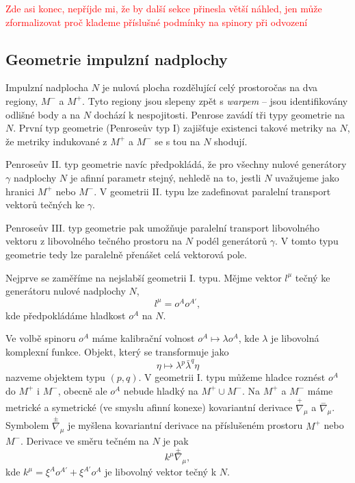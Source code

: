 \textcolor{red}{Zde asi konec, nepříjde mi, že by další sekce přinesla větší náhled, jen může zformalizovat proč klademe
příslušné podmínky na spinory při odvození}
\subsection{Geometrie impulzní nadplochy}

Impulzní nadplocha $N$ je nulová plocha rozdělující celý prostoročas na dva regiony, $M^-$ a $M^+$.
Tyto regiony jsou slepeny zpět s \emph{warpem} -- jsou identifikovány odlišné body a na $N$ dochází k
nespojitosti. Penrose zavádí tři typy geometrie na $N$.
První typ geometrie (Penroseův typ I) zajišťuje existenci takové metriky na $N$, že metriky indukované z $M^+$ a $M^-$
se s tou na $N$ shodují.

Penroseův II. typ geometrie navíc předpokládá, že pro všechny nulové generátory $\gamma$ nadplochy $N$
je afinní parametr stejný, nehledě na to, jestli $N$ uvažujeme jako hranici $M^+$ nebo $M^-$.
V geometrii II. typu lze zadefinovat paralelní transport vektorů tečných ke $\gamma$.

Penroseův III. typ geometrie pak umožňuje paralelní transport libovolného vektoru z libovolného tečného prostoru
na $N$ podél generátorů $\gamma$. V tomto typu geometrie tedy lze paralelně přenášet celá vektorová pole.

Nejprve se zaměříme na nejslabší geometrii I. typu. Mějme vektor $l^\mu$ tečný ke generátoru
nulové nadplochy $N$,
\begin{equation}
    l^\mu = o^A o^{A'},
\end{equation}
kde předpokládáme hladkost $o^A$ na $N$.

Ve volbě spinoru $o^A$ máme kalibrační volnost $o^A \mapsto \lambda o^A$, kde $\lambda$ je libovolná komplexní funkce.
Objekt, který se transformuje jako
\begin{equation}
    \eta \mapsto \lambda^p \bar{\lambda}^q \eta
\end{equation}
nazveme objektem typu $(p, q)$. V geometrii I. typu můžeme hladce roznést $o^A$ do
$M^+$ i $M^-$, obecně ale $o^A$ nebude hladký na $M^+ \cup M^-$. Na $M^+$ a $M^-$ máme
metrické a symetrické (ve smyslu afinní konexe) kovariantní derivace $\stackrel{+}{\nabla}_\mu$ a $\stackrel{-}{\nabla}_\mu$. Symbolem
$\stackrel{\pm}{\nabla}_\mu$ je myšlena kovariantní derivace na příslušeném prostoru $M^+$ nebo $M^-$.
Derivace ve směru tečném na $N$ je pak
\begin{equation}
    k^\mu \stackrel{\pm}{\nabla}_\mu,
\end{equation}
kde $k^\mu = \xi^A o^{A'} + \xi^{A'} o^A$ je libovolný vektor tečný k $N$.

